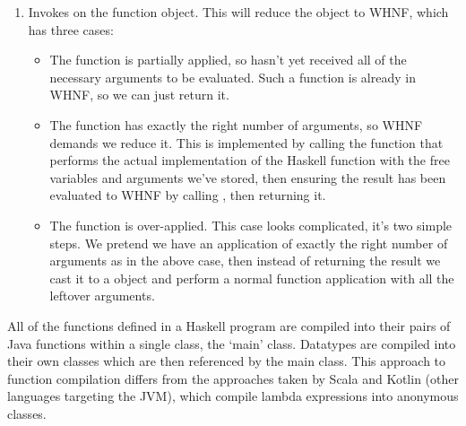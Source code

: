 \documentclass[dissertation.tex]{subfiles}
\begin{document}
{{{{\begin{enumerate}
{                }
                \item
                {

                    Invokes  on the function object. This will reduce the object to WHNF, which has three
                    cases:
                    
                    \begin{itemize}
                    \item
                    {

                        The function is partially applied, so hasn't yet received all of the necessary arguments to be
                        evaluated. Such a function is already in WHNF, so we can just return it.

                    }
                    \item
                    {

                        The function has exactly the right number of arguments, so WHNF demands we reduce it. This is
                        implemented by calling the  function that performs the actual implementation of the
                        Haskell function with the free variables and arguments we've stored, then ensuring the result
                        has been evaluated to WHNF by calling , then returning it.

                    }
                    \item
                    {

                        The function is over-applied. This case looks complicated, it's two simple steps. We pretend we
                        have an application of exactly the right number of arguments as in the above case, then instead
                        of returning the result we cast it to a  object and perform a normal function
                        application with all the leftover arguments.

                    }
                    \end{itemize}
                }
                \end{enumerate}

                All of the functions defined in a Haskell program are compiled into their pairs of Java functions within
                a single class, the `main' class. Datatypes are compiled into their own classes which are then
                referenced by the main class. This approach to function compilation differs from the approaches taken by
                Scala and Kotlin (other languages targeting the JVM), which compile lambda expressions into anonymous
                classes.

}}}}
\end{document}
